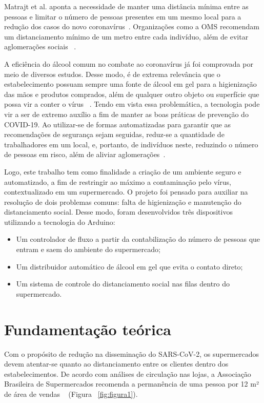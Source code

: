 \documentclass[10pt,twocolumn,letterpaper]{article}
\begin{document}
Matrajt et al. aponta a necessidade de manter uma distância mínima entre as pessoas e limitar o número de pessoas presentes em um mesmo local para a redução dos casos do novo coronavírus~\cite{3}. Organizações como a OMS recomendam um distanciamento mínimo de um metro entre cada indivíduo, além de evitar aglomerações sociais  ~\cite{2}.

A eficiência do álcool comum no combate ao coronavírus já foi comprovada por meio de diversos estudos. Desse modo, é de extrema relevância que o estabelecimento possuam sempre uma fonte de álcool em gel para a higienização das mãos e produtos comprados, além de qualquer outro objeto ou superfície que possa vir a conter o vírus ~\cite{4}.
Tendo em vista essa problemática, a tecnologia pode vir a ser de extremo auxílio a fim de manter as boas práticas de prevenção do COVID-19. Ao utilizar-se de formas automatizadas para garantir que as recomendações de segurança sejam seguidas, reduz-se a quantidade de trabalhadores em um local, e, portanto, de indivíduos neste, reduzindo o número de pessoas em risco, além de aliviar aglomerações~\cite{5}.

Logo, este trabalho tem como finalidade a criação de um ambiente seguro e automatizado, a fim de restringir ao máximo a contaminação pelo vírus, contextualizado em um supermercado. O projeto foi pensado para auxiliar na resolução de dois problemas comuns: falta de higienização e manutenção do distanciamento social. Desse modo, foram desenvolvidos três dispositivos utilizando a tecnologia do Arduino: 

\begin{itemize}
  \item Um controlador de fluxo a partir da contabilização do número de pessoas que entram e saem do ambiente do supermercado;
  \item Um distribuidor automático de álcool em gel  que evita o contato direto;
  \item Um sistema de controle do distanciamento social nas filas dentro do supermercado.
\end{itemize}


\section{Fundamentação teórica}

Com o propósito de redução na disseminação do SARS-CoV-2, os supermercados devem atentar-se quanto ao distanciamento entre os clientes dentro dos estabelecimentos. De acordo com análises de circulação nas lojas, a Associação Brasileira de Supermercados recomenda a permanência de uma pessoa por 12 m² de área de vendas ~\cite{6} (Figura ~\ref{fig:figura1}).
\end{document}
